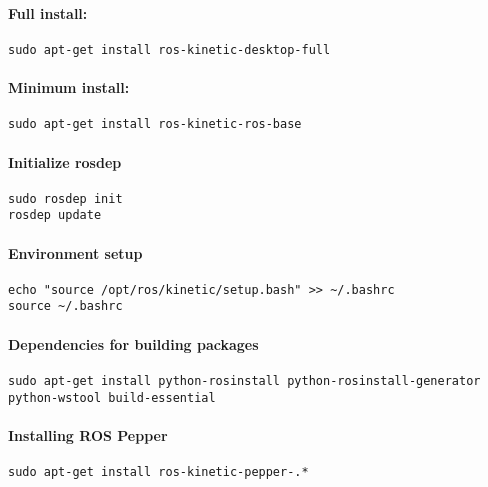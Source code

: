 \paragraph{Full install:}

\begin{verbatim}
sudo apt-get install ros-kinetic-desktop-full
\end{verbatim}

\paragraph{Minimum install:}

\begin{verbatim}
sudo apt-get install ros-kinetic-ros-base
\end{verbatim}

\paragraph{Initialize rosdep}

\begin{verbatim}
sudo rosdep init
rosdep update
\end{verbatim}

\paragraph{Environment setup}

\begin{verbatim}
echo "source /opt/ros/kinetic/setup.bash" >> ~/.bashrc
source ~/.bashrc
\end{verbatim}

\paragraph{Dependencies for building packages}

\begin{verbatim}
sudo apt-get install python-rosinstall python-rosinstall-generator python-wstool build-essential
\end{verbatim}

\paragraph{Installing ROS Pepper}\label{installing-ros-pepper}

\begin{verbatim}
sudo apt-get install ros-kinetic-pepper-.*
\end{verbatim}

